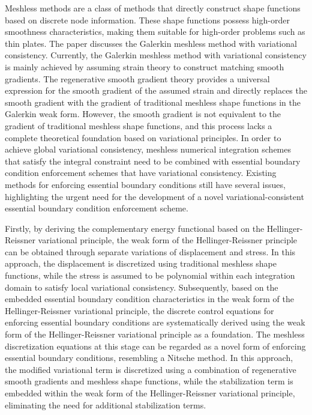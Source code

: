 \documentclass[engineeringmaster]{hquThesis}
\begin{document}
\begin{abstractEn}
    Meshless methods are a class of methods that directly construct shape functions based on discrete node information. These shape functions possess high-order smoothness characteristics, making them suitable for high-order problems such as thin plates.
The paper discusses the Galerkin meshless method with variational consistency. Currently, the Galerkin meshless method with variational consistency is mainly achieved by assuming strain theory to construct matching smooth gradients. The regenerative smooth gradient theory provides a universal expression for the smooth gradient of the assumed strain and directly replaces the smooth gradient with the gradient of traditional meshless shape functions in the Galerkin weak form.
However, the smooth gradient is not equivalent to the gradient of traditional meshless shape functions, and this process lacks a complete theoretical foundation based on variational principles. In order to achieve global variational consistency, meshless numerical integration schemes that satisfy the integral constraint need to be combined with essential boundary condition enforcement schemes that have variational consistency. Existing methods for enforcing essential boundary conditions still have several issues, highlighting the urgent need for the development of a novel variational-consistent essential boundary condition enforcement scheme.
\par
Firstly, by deriving the complementary energy functional based on the Hellinger-Reissner variational principle, the weak form of the Hellinger-Reissner principle can be obtained through separate variations of displacement and stress. In this approach, the displacement is discretized using traditional meshless shape functions, while the stress is assumed to be polynomial within each integration domain to satisfy local variational consistency.
Subsequently, based on the embedded essential boundary condition characteristics in the weak form of the Hellinger-Reissner variational principle, the discrete control equations for enforcing essential boundary conditions are systematically derived using the weak form of the Hellinger-Reissner variational principle as a foundation.
The meshless discretization equations at this stage can be regarded as a novel form of enforcing essential boundary conditions, resembling a Nitsche method. In this approach, the modified variational term is discretized using a combination of regenerative smooth gradients and meshless shape functions, while the stabilization term is embedded within the weak form of the Hellinger-Reissner variational principle, eliminating the need for additional stabilization terms.

\end{abstractEn}
\end{document}

